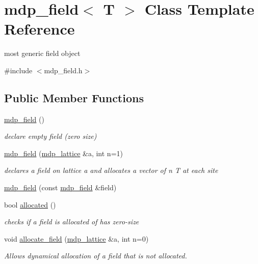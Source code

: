 \hypertarget{classmdp__field}{
\section{mdp\_\-field$<$ T $>$ Class Template Reference}
\label{classmdp__field}
}


most generic field object  


{\ttfamily \#include $<$mdp\_\-field.h$>$}\subsection*{Public Member Functions}
\begin{DoxyCompactItemize}
\item 
\hyperlink{classmdp__field_ab3e16ee58db96391a255579bc89d8535}{mdp\_\-field} ()
\begin{DoxyCompactList}\small\item\em declare empty field (zero size) \item\end{DoxyCompactList}\item 
\hyperlink{classmdp__field_aaae273c82d9b0931e31f7265d5ca2652}{mdp\_\-field} (\hyperlink{classmdp__lattice}{mdp\_\-lattice} \&a, int n=1)
\begin{DoxyCompactList}\small\item\em declares a field on lattice a and allocates a vector of n T at each site \item\end{DoxyCompactList}\item 
\hyperlink{classmdp__field_a0f143d8cceb191d24cf72025091a03a9}{mdp\_\-field} (const \hyperlink{classmdp__field}{mdp\_\-field} \&field)
\item 
bool \hyperlink{classmdp__field_ad306195eb4961253cef69e5fb33bce69}{allocated} ()
\begin{DoxyCompactList}\small\item\em checks if a field is allocated of has zero-\/size \item\end{DoxyCompactList}\item 
void \hyperlink{classmdp__field_ab76ac5e0273aa3e1b5070fc3d7a0dc84}{allocate\_\-field} (\hyperlink{classmdp__lattice}{mdp\_\-lattice} \&a, int n=0)
\begin{DoxyCompactList}\small\item\em Allows dynamical allocation of a field that is not allocated. \item\end{DoxyCompactList}\item 

\end{DoxyCompactItemize}
